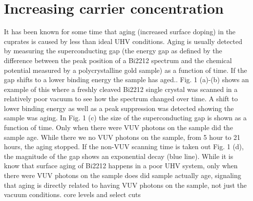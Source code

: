 \documentclass[aps,twocolumn,amsmath,amssymb,showpacs,prb,
superscriptaddress,unsortedaddress]{revtex4}
\begin{document}
\section{Increasing carrier concentration}

It has been known for some time that aging (increased surface doping)
in the cuprates is caused by less than ideal UHV
conditions\cite{SHEN1}.  Aging is usually detected by measuring the
superconducting gap (the energy gap as defined by the difference
between the peak position of a Bi2212 spectrum and the chemical
potential measured by a polycrystalline gold sample) as a function of
time.  If the gap shifts to a lower binding energy the sample has
aged.\cite{H. Ding 1997,P. Schwaller 2000}.  Fig. 1 (a)-(b) shows an
example of this where a freshly cleaved Bi2212 single crystal was
scanned in a relatively poor vacuum to see how the spectrum changed
over time. A shift to lower binding energy as well as a peak
suppression was detected showing the sample was aging.  In Fig. 1 (c)
the size of the superconducting gap is shown as a function of time.
Only when there were VUV photons on the sample did the sample age.
While there we no VUV photons on the sample, from 5 hour to 21 hours,
the aging stopped. If the non-VUV scanning time is taken out Fig. 1
(d), the magnitude of the gap shows an exponential decay (blue line).
While it is know that surface aging of Bi2212 happens in a poor UHV
system, only when there were VUV photons on the sample does did sample
actually age, signaling that aging is directly related to having VUV
photons on the sample, not just the vacuum conditions. 
core levels and select cuts
\end{document}
